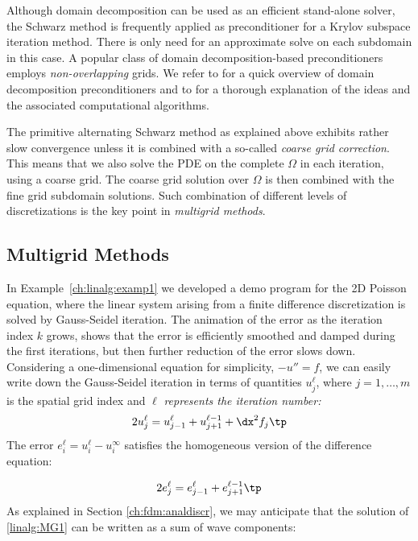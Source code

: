 Although domain decomposition can be used as an efficient
stand-alone solver, the Schwarz method is frequently applied as
preconditioner for  a Krylov subspace iteration method.
There is only need for an approximate solve on each subdomain in this case.
A popular class of
domain decomposition-based preconditioners employs \emph{non-overlapping}
grids. We refer to \cite{linalgtemplates93} for a quick overview
of domain decomposition preconditioners and to \cite{SmithBjorstadGropp96} for a
thorough explanation of the ideas and the associated
computational algorithms.

The primitive alternating Schwarz method as explained above exhibits
rather slow
convergence unless it is combined with a so-called \emph{coarse grid
correction}. This means that we also
solve the PDE on the complete $\Omega$ in each iteration,
using a coarse grid. The coarse grid solution over $\Omega$ is then
combined with the
fine grid subdomain solutions. Such combination of different levels
of discretizations is the key point in \emph{multigrid methods}.

\subsection{Multigrid Methods}
\label{ch:linalg:ML}
In Example~\ref{ch:linalg:examp1} we developed a demo program for the
2D Poisson equation, where the linear system arising from a finite
difference discretization is solved by Gauss-Seidel iteration.
The animation of the error as the iteration index $k$ grows, shows that
the error is efficiently smoothed and damped during the first iterations,
but then further reduction of the error slows down.
Considering a one-dimensional equation for simplicity, $-u''=f$,
we can easily write down the Gauss-Seidel iteration in terms of
quantities $u_j^{\ell}$, where $j=1,\ldots,m$
is the spatial grid index and $\ell$ \emph{represents
the iteration number:}
\[ 2u_j^\ell =  u_{j-1}^{\ell} + u_{j+1}^{\ell-1} + \dx^2f_j \tp \]
The error $e_i^\ell =u_i^\ell - u_i^\infty$ satisfies
the homogeneous version of the difference equation:

\begin{equation}
2e_j^\ell =  e_{j-1}^{\ell} + e_{j+1}^{\ell-1}\tp
\label{linalg:MG1}
\end{equation}
As explained in Section \ref{ch:fdm:analdiscr}, we may anticipate that
the solution of \eqref{linalg:MG1} can be written as a sum of
wave components:

